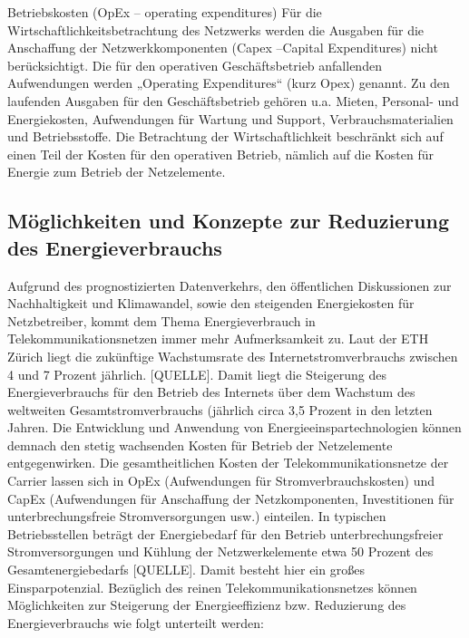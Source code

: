\documentclass[12pt,titlepage]{article}
\begin{document}
Betriebskosten (OpEx – operating expenditures) 
Für die Wirtschaftlichkeitsbetrachtung des Netzwerks werden die Ausgaben für die Anschaffung der Netzwerkkomponenten (Capex –Capital Expenditures) nicht berücksichtigt. Die für den operativen Geschäftsbetrieb anfallenden Aufwendungen werden „Operating Expenditures“ (kurz Opex) genannt. Zu den laufenden Ausgaben für den Geschäftsbetrieb gehören u.a. Mieten, Personal- und Energiekosten, Aufwendungen für Wartung und Support, Verbrauchsmaterialien und Betriebsstoffe. 
Die Betrachtung der Wirtschaftlichkeit beschränkt sich auf einen Teil der Kosten für den operativen Betrieb, nämlich auf die Kosten für Energie zum Betrieb der Netzelemente.


\subsection{Möglichkeiten und Konzepte zur Reduzierung des Energieverbrauchs}
Aufgrund des prognostizierten Datenverkehrs, den öffentlichen Diskussionen zur Nachhaltigkeit und Klimawandel, sowie den steigenden Energiekosten für Netzbetreiber, kommt dem Thema Energieverbrauch in Telekommunikationsnetzen immer mehr Aufmerksamkeit zu. Laut der ETH Zürich liegt die zukünftige Wachstumsrate des Internetstromverbrauchs zwischen 4 und 7 Prozent jährlich. [QUELLE]. Damit liegt die Steigerung des Energieverbrauchs für den Betrieb des Internets über dem Wachstum des weltweiten Gesamtstromverbrauchs (jährlich circa 3,5 Prozent in den letzten Jahren.  Die Entwicklung und Anwendung von Energieeinspartechnologien können demnach den stetig wachsenden Kosten für Betrieb der Netzelemente entgegenwirken. 
Die gesamtheitlichen Kosten der Telekommunikationsnetze der Carrier lassen sich in OpEx (Aufwendungen für Stromverbrauchskosten) und CapEx (Aufwendungen für Anschaffung der Netzkomponenten, Investitionen für unterbrechungsfreie Stromversorgungen usw.) einteilen. In typischen Betriebsstellen beträgt der Energiebedarf für den Betrieb unterbrechungsfreier Stromversorgungen und Kühlung der Netzwerkelemente etwa 50 Prozent des Gesamtenergiebedarfs [QUELLE]. Damit besteht hier ein großes Einsparpotenzial. Bezüglich des reinen Telekommunikationsnetzes können Möglichkeiten zur Steigerung der Energieeffizienz bzw. Reduzierung des Energieverbrauchs wie folgt unterteilt werden:
\end{document}
